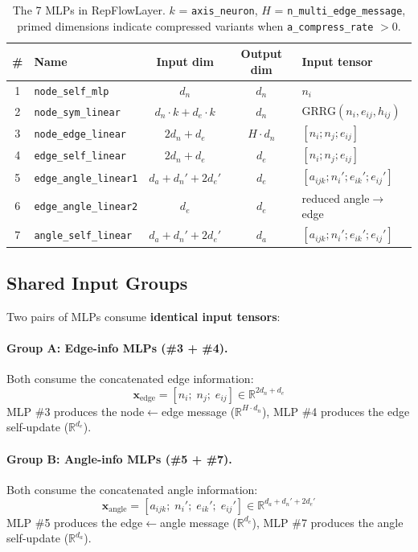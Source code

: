 \documentclass[11pt,a4paper]{article}
\newcommand{\R}{\mathbb{R}}
\newcommand{\x}{\mathbf{x}}
\begin{document}
\begin{table}[h]
\centering
\begin{tabular}{clccl}
\toprule
\# & Name & Input dim & Output dim & Input tensor \\
\midrule
1 & \texttt{node\_self\_mlp} & $d_n$ & $d_n$ & $n_i$ \\
2 & \texttt{node\_sym\_linear} & $d_n \cdot k + d_e \cdot k$ & $d_n$ & $\text{GRRG}(n_i, e_{ij}, h_{ij})$ \\
3 & \texttt{node\_edge\_linear} & $2d_n + d_e$ & $H \cdot d_n$ & $[n_i; n_j; e_{ij}]$ \\
4 & \texttt{edge\_self\_linear} & $2d_n + d_e$ & $d_e$ & $[n_i; n_j; e_{ij}]$ \\
5 & \texttt{edge\_angle\_linear1} & $d_a + d_n' + 2d_e'$ & $d_e$ & $[a_{ijk}; n_i'; e_{ik}'; e_{ij}']$ \\
6 & \texttt{edge\_angle\_linear2} & $d_e$ & $d_e$ & reduced angle$\to$edge \\
7 & \texttt{angle\_self\_linear} & $d_a + d_n' + 2d_e'$ & $d_a$ & $[a_{ijk}; n_i'; e_{ik}'; e_{ij}']$ \\
\bottomrule
\end{tabular}
\caption{The 7 MLPs in RepFlowLayer. $k$ = \texttt{axis\_neuron}, $H$ = \texttt{n\_multi\_edge\_message}, primed dimensions indicate compressed variants when \texttt{a\_compress\_rate} $> 0$.}
\label{tab:mlps}
\end{table}

\subsection{Shared Input Groups}

Two pairs of MLPs consume \textbf{identical input tensors}:

\paragraph{Group A: Edge-info MLPs (\#3 + \#4).}
Both consume the concatenated edge information:
\begin{equation}
    \x_{\text{edge}} = [n_i;\; n_j;\; e_{ij}] \in \R^{2d_n + d_e}
\end{equation}
MLP \#3 produces the node$\leftarrow$edge message ($\R^{H \cdot d_n}$), MLP \#4 produces the edge self-update ($\R^{d_e}$).

\paragraph{Group B: Angle-info MLPs (\#5 + \#7).}
Both consume the concatenated angle information:
\begin{equation}
    \x_{\text{angle}} = [a_{ijk};\; n_i';\; e_{ik}';\; e_{ij}'] \in \R^{d_a + d_n' + 2d_e'}
\end{equation}
MLP \#5 produces the edge$\leftarrow$angle message ($\R^{d_e}$), MLP \#7 produces the angle self-update ($\R^{d_a}$).
\end{document}
